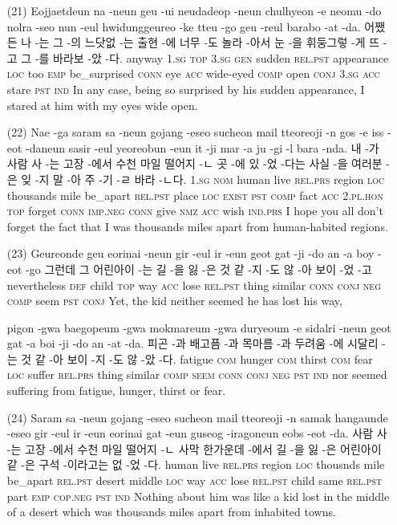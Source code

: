 \begin{itemize}
\item [(21)]
\tgl
		{Eojjaetdeun na -neun geu -ui neudadeop -neun chulhyeon -e neomu -do nolra -seo nun -eul hwidunggeureo -ke tteu -go geu -reul barabo -at -da.}
		{어쨌든 나 -는 그 -의 느닷없 -는 출현 -에 너무 -도 놀라 -아서 눈 -을 휘둥그렇 -게 뜨 -고 그 -를 바라보 -았 -다.}
		{anyway	\textsc{1.sg}	\textsc{top}	\textsc{3.sg}	\textsc{gen}	sudden	\textsc{rel.pst}	appearance	\textsc{loc}	too	\textsc{emp}	be\_surprised	\textsc{conn}	eye	\textsc{acc}	wide-eyed	\textsc{comp}	open	\textsc{conj}	\textsc{3.sg}	\textsc{acc}	stare	\textsc{pst}	\textsc{ind}}
		{In any case, being so surprised by his sudden appearance, I stared at him with my eyes wide open.}
		
\item [(22)]
\tgl
		{Nae -ga saram sa -neun gojang -eseo sucheon mail tteoreoji -n gos -e iss -eot -daneun sasir -eul yeoreobun -eun it -ji mar -a ju -gi -l bara -nda.}
		{내 -가 사람 사 -는 고장 -에서 수천 마일 떨어지 -ㄴ 곳 -에 있 -었 -다는 사실 -을 여러분 -은 잊 -지 말 -아 주 -기 -ㄹ 바라 -ㄴ다.}
		{\textsc{1.sg}	\textsc{nom}	human	live	\textsc{rel.prs}	region	\textsc{loc}	thousands	mile	be\_apart	\textsc{rel.pst}	place	\textsc{loc}	\textsc{exist}	\textsc{pst}	\textsc{comp}	fact	\textsc{acc}	\textsc{2.pl.hon}	\textsc{top}	forget	\textsc{conn}	\textsc{imp.neg}	\textsc{conn}	give	\textsc{nmz}	\textsc{acc}	wish	\textsc{ind.prs}}
		{I hope you all don't forget the fact that I was thousands miles apart from human-habited regions.}
		
\item [(23)]
\tgl
		{Geureonde geu eorinai -neun gir -eul ir -eun geot gat -ji -do an -a boy -eot -go}
		{그런데 그 어린아이 -는 길 -을 잃 -은 것 같 -지 -도 않 -아 보이 -었 -고}
		{nevertheless	\textsc{def}	child	\textsc{top}	way	\textsc{acc}	lose	\textsc{rel.pst}	thing	similar	\textsc{conn}	\textsc{conj}	\textsc{neg}	\textsc{comp}	seem	\textsc{pst}	\textsc{conj}}
		{Yet, the kid neither seemed he has lost his way,}
		
\tgl
		{pigon -gwa baegopeum -gwa mokmareum -gwa duryeoum -e sidalri -neun geot gat -a boi -ji -do an -at -da.}
		{피곤 -과 배고픔 -과 목마름 -과 두려움 -에 시달리 -는 것 같 -아 보이 -지 -도 않 -았 -다.}
		{fatigue	\textsc{com}	hunger	\textsc{com}	thirst	\textsc{com}	fear	\textsc{loc}	suffer	\textsc{rel.prs}	thing	similar	\textsc{comp}	\textsc{seem}	\textsc{conn}	\textsc{conj}	\textsc{neg}	\textsc{pst}	\textsc{ind}}
		{nor seemed suffering from fatigue, hunger, thirst or fear.}
		
\item [(24)]
\tgl
		{Saram sa -neun gojang -eseo sucheon mail tteoreoji -n samak hangaunde -eseo gir -eul ir -eun eorinai gat -eun guseog -iragoneun eobs -eot -da.}
		{사람 사 -는 고장 -에서 수천 마일 떨어지 -ㄴ 사막 한가운데 -에서 길 -을 잃 -은 어린아이 같 -은 구석 -이라고는 없 -었 -다.}
		{human	live	\textsc{rel.prs}	region	\textsc{loc}	thousnds	mile	be\_apart	\textsc{rel.pst}	desert	middle	\textsc{loc}	way	\textsc{acc}	lose	\textsc{rel.pst}	child	same	\textsc{rel.pst}	part	\textsc{emp}	\textsc{cop.neg}	\textsc{pst}	\textsc{ind}}
		{Nothing about him was like a kid lost in the middle of a desert which was thousands miles apart from inhabited towns.}
		

\end{itemize}
